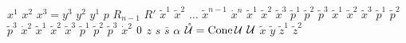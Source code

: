 \documentclass[oneside]{book}
\begin{document}
$x^1$%
\stopmpxshipout
\mpxshipout%
$x^2$%
\stopmpxshipout
\mpxshipout%
$x^3=y^3$%
\stopmpxshipout
\mpxshipout%
$y^2$%
\stopmpxshipout
\mpxshipout%
$y^1$%
\stopmpxshipout
\mpxshipout%
$p$%
\stopmpxshipout
\mpxshipout%
$R_{n-1}$%
\stopmpxshipout
\mpxshipout%
$R'$%
\stopmpxshipout
\mpxshipout%
$\tilde x^1$%
\stopmpxshipout
\mpxshipout%
$\tilde x^2$%
\stopmpxshipout
\mpxshipout%
$\dots$%
\stopmpxshipout
\mpxshipout%
$\tilde x^{n-1}$%
\stopmpxshipout
\mpxshipout%
$\dot x^n$%
\stopmpxshipout
\mpxshipout%
$\tilde x^1$%
\stopmpxshipout
\mpxshipout%
$\tilde x^2$%
\stopmpxshipout
\mpxshipout%
$\tilde x^3$%
\stopmpxshipout
\mpxshipout%
$\tilde p^1$%
\stopmpxshipout
\mpxshipout%
$\tilde p^2$%
\stopmpxshipout
\mpxshipout%
$\tilde p^3$%
\stopmpxshipout
\mpxshipout%
$\tilde x^1$%
\stopmpxshipout
\mpxshipout%
$\tilde x^2$%
\stopmpxshipout
\mpxshipout%
$\tilde x^3$%
\stopmpxshipout
\mpxshipout%
$\tilde p^1$%
\stopmpxshipout
\mpxshipout%
$\tilde p^2$%
\stopmpxshipout
\mpxshipout%
$\tilde p^3$%
\stopmpxshipout
\mpxshipout%
$\dot x^2$%
\stopmpxshipout
\mpxshipout%
$\tilde x^1$%
\stopmpxshipout
\mpxshipout%
$\tilde x^2$%
\stopmpxshipout
\mpxshipout%
$\tilde x^3$%
\stopmpxshipout
\mpxshipout%
$\tilde p^1$%
\stopmpxshipout
\mpxshipout%
$\tilde p^2$%
\stopmpxshipout
\mpxshipout%
$\tilde p^3$%
\stopmpxshipout
\mpxshipout%
$\dot x^2$%
\stopmpxshipout
\mpxshipout%
$0$%
\stopmpxshipout
\mpxshipout%
$z$%
\stopmpxshipout
\mpxshipout%
$s$%
\stopmpxshipout
\mpxshipout%
$\bar s$%
\stopmpxshipout
\mpxshipout%
$\alpha$%
\stopmpxshipout
\mpxshipout%
$\mathring{\mathcal{U}}=\mathop{\rm Cone}\nolimits \mathcal{U}$%
\stopmpxshipout
\mpxshipout%
$\mathcal{U}$%
\stopmpxshipout
\mpxshipout%
$\tilde x$%
\stopmpxshipout
\mpxshipout%
$\tilde y$%
\stopmpxshipout
\mpxshipout%
$\tilde z^1$%
\stopmpxshipout
\mpxshipout%
$\tilde z^2$%
\stopmpxshipout
\mpxshipout%
\end{document}
